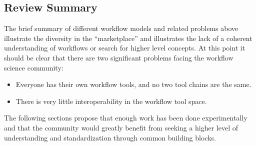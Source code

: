 


\subsection{Review Summary}

The brief summary of different workflow models and related problems above illustrate the
diversity in the ``marketplace'' and illustrates the lack of a coherent understanding of 
workflows or search for higher level concepts. At this point it should be clear that there are 
two significant problems facing the workflow science community:
\begin{itemize}
  \item Everyone has their own workflow tools, and no two tool chains are the same.
  \item There is very little interoperability in the workflow tool space.
\end{itemize} The following sections propose that enough work has
been done experimentally and that the community would greatly benefit from seeking a
higher level of understanding and standardization through common building blocks.

